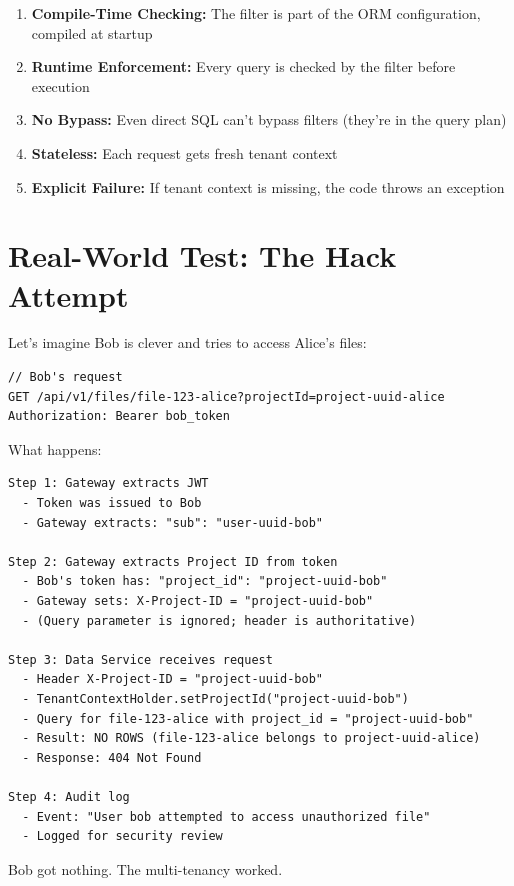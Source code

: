 \documentclass[11pt,a4paper]{report}
\begin{document}
\begin{enumerate}
\item \textbf{Compile-Time Checking:} The filter is part of the ORM configuration, compiled at startup
\item \textbf{Runtime Enforcement:} Every query is checked by the filter before execution
\item \textbf{No Bypass:} Even direct SQL can't bypass filters (they're in the query plan)
\item \textbf{Stateless:} Each request gets fresh tenant context
\item \textbf{Explicit Failure:} If tenant context is missing, the code throws an exception

\end{enumerate}

\section{Real-World Test: The Hack Attempt}


Let's imagine Bob is clever and tries to access Alice's files:

\begin{lstlisting}[language=text]
// Bob's request
GET /api/v1/files/file-123-alice?projectId=project-uuid-alice
Authorization: Bearer bob_token
\end{lstlisting}

What happens:

\begin{lstlisting}[language=text]
Step 1: Gateway extracts JWT
  - Token was issued to Bob
  - Gateway extracts: "sub": "user-uuid-bob"

Step 2: Gateway extracts Project ID from token
  - Bob's token has: "project_id": "project-uuid-bob"
  - Gateway sets: X-Project-ID = "project-uuid-bob"
  - (Query parameter is ignored; header is authoritative)

Step 3: Data Service receives request
  - Header X-Project-ID = "project-uuid-bob"
  - TenantContextHolder.setProjectId("project-uuid-bob")
  - Query for file-123-alice with project_id = "project-uuid-bob"
  - Result: NO ROWS (file-123-alice belongs to project-uuid-alice)
  - Response: 404 Not Found

Step 4: Audit log
  - Event: "User bob attempted to access unauthorized file"
  - Logged for security review
\end{lstlisting}

Bob got nothing. The multi-tenancy worked.
\end{document}
